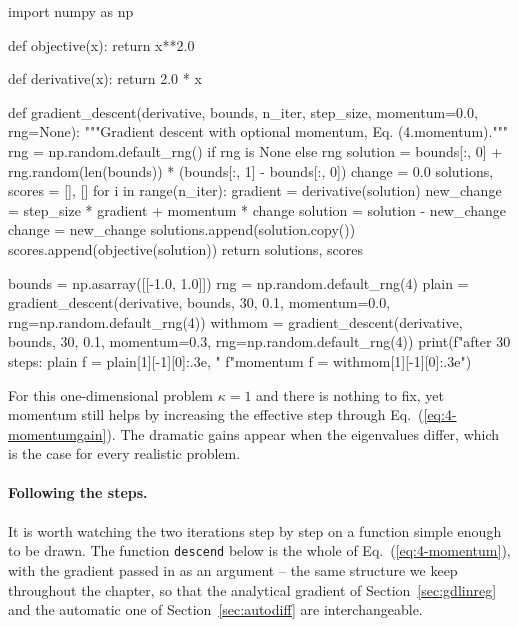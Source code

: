 \begin{Python}{}
import numpy as np

def objective(x):
    return x**2.0

def derivative(x):
    return 2.0 * x

def gradient_descent(derivative, bounds, n_iter, step_size, momentum=0.0,
                     rng=None):
    """Gradient descent with optional momentum, Eq. (4.momentum)."""
    rng = np.random.default_rng() if rng is None else rng
    solution = bounds[:, 0] + rng.random(len(bounds)) * (bounds[:, 1] - bounds[:, 0])
    change = 0.0
    solutions, scores = [], []
    for i in range(n_iter):
        gradient = derivative(solution)
        new_change = step_size * gradient + momentum * change
        solution = solution - new_change
        change = new_change
        solutions.append(solution.copy())
        scores.append(objective(solution))
    return solutions, scores


bounds = np.asarray([[-1.0, 1.0]])
rng = np.random.default_rng(4)
plain = gradient_descent(derivative, bounds, 30, 0.1, momentum=0.0,
                         rng=np.random.default_rng(4))
withmom = gradient_descent(derivative, bounds, 30, 0.1, momentum=0.3,
                           rng=np.random.default_rng(4))
print(f"after 30 steps: plain f = {plain[1][-1][0]:.3e}, "
      f"momentum f = {withmom[1][-1][0]:.3e}")
\end{Python}

For this one-dimensional problem $\kappa=1$ and there is nothing to fix, yet
momentum still helps by increasing the effective step through
Eq.~(\ref{eq:4-momentumgain}).  The dramatic gains appear when the eigenvalues
differ, which is the case for every realistic problem.

\paragraph{Following the steps.}
It is worth watching the two iterations step by step on a function simple
enough to be drawn.  The function \texttt{descend} below is the whole of
Eq.~(\ref{eq:4-momentum}), with the gradient passed in as an argument -- the
same structure we keep throughout the chapter, so that the analytical
gradient of Section~\ref{sec:gdlinreg} and the automatic one of
Section~\ref{sec:autodiff} are interchangeable.

